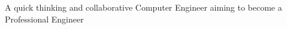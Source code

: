 

\begin{cvskills}

  \cvskill
    {}
    {A quick thinking and collaborative Computer Engineer aiming to become a Professional Engineer    
    }

\end{cvskills}
